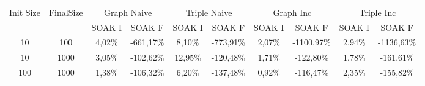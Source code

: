 \begin{sidewaystable}
\begin{tabular}{|c|c|cc|cc|cc|cc|}
		\hline %
	\end{tabular}
	\caption[\textsc{Analyser} Investigation Stack - Level 1 - SOAK Test Average Latency Comparison]{Max Latency Comparison Step Response}
	\label{tab:step_latency_comparisons_max}
	

	\begin{tabular}{|c|c|cc|cc|cc|cc|} %
	  	\hline
		Init Size&FinalSize &\multicolumn{2}{c}{Graph Naive}  &\multicolumn{2}{c}{Triple Naive}&\multicolumn{2}{c}{Graph Inc}  &\multicolumn{2}{c}{Triple Inc}\\\
		&& SOAK I & SOAK F& SOAK I & SOAK F& SOAK I & SOAK F& SOAK I & SOAK F\\
		\hline
		\hline
		10	&100	&4,02\%&	-661,17\%&	8,10\%&	-773,91\%&	2,07\%&	-1100,97\%&	2,94\%&	-1136,63\%\\	
		10	&1000	&3,05\%&	-102,62\%&	12,95\%&	-120,48\%&	1,71\%&	-122,80\%&	1,78\%&	-161,61\%	\\
		100	&1000&	1,38\%&	-106,32\%&	6,20\%&	-137,48\%&	0,92\%&	-116,47\%&	2,35\%&	-155,82\%	\\

		\hline %
	\end{tabular}
	\caption[\textsc{Analyser} Investigation Stack - Level 1 - SOAK Test Average Latency Comparison]{Max Memory Comparison Step Response}
	\label{tab:step_memory_comparisons_max}

	
\end{sidewaystable}